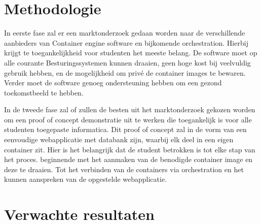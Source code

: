 





\section{Methodologie}
\label{sec:methodologie}

In eerste fase zal er een marktonderzoek gedaan worden naar de verschillende aanbieders van Container engine software en bijkomende  orchestration. Hierbij krijgt te toegankelijkheid voor studenten het meeste belang. De software moet op alle courante Besturingssystemen kunnen draaien, geen hoge kost bij veelvuldig gebruik hebben, en de mogelijkheid om privé de container images te bewaren. Verder moet de software genoeg ondersteuning hebben om een gezond toekomstbeeld te hebben.

In de tweede fase zal of zullen de besten uit het marktonderzoek gekozen worden om een proof of concept demonstratie uit te werken die toegankelijk is voor alle studenten toegepaste informatica. Dit proof of concept zal in de vorm van een eenvoudige webapplicatie met databank zijn, waarbij elk deel in een eigen container zit. Hier is het belangrijk dat de student betrokken is tot elke stap van het proces. beginnende met het aanmaken van de benodigde container image en deze te draaien. Tot het verbinden van de containers via orchestration en het kunnen aanspreken van de opgestelde webapplicatie.    


\section{Verwachte resultaten}
\label{sec:verwachte_resultaten}


